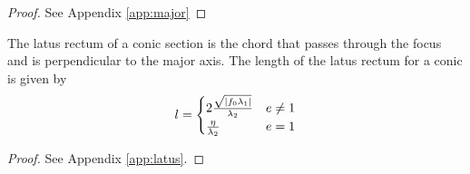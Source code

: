 \documentclass[journal,12pt,onecolumn]{IEEEtran}
\begin{document}
\begin{proof}
	See Appendix \ref{app:major}
\end{proof}
\begin{theorem}
    The latus rectum of a conic section is the chord that passes through the focus and is perpendicular to the major axis.
	The length of the latus rectum for a conic is given by
		\begin{align}
			l =
			\begin{cases}
				2\frac{\sqrt{\left\vert f_0\lambda_1\right\vert}}{\lambda_2} & e \ne 1
			\\
			\frac{\eta}{\lambda_2} & e = 1
			\end{cases}
			\label{eq:latus-ellipse}
		\end{align}
\end{theorem}
		\begin{proof}
			See Appendix \ref{app:latus}.
\end{proof}
\end{document}
